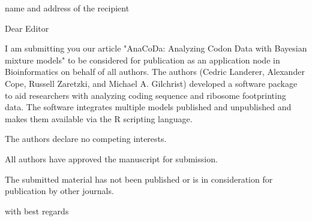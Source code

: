 \documentclass[11pt,letterpaper]{letter}
\begin{document}
 
\begin{letter}{name and address of the recipient} 
\opening{Dear Editor} 

I am submitting you our article "AnaCoDa: Analyzing Codon Data with Bayesian mixture models" to be considered for publication as an application node in Bioinformatics on behalf of all authors.
The authors (Cedric Landerer, Alexander Cope, Russell Zaretzki, and Michael A. Gilchrist) developed a software package to aid researchers with analyzing coding sequence and ribosome footprinting data. 
The software integrates multiple models published and unpublished and makes them available via the R scripting language. 

The authors declare no competing interests.

All authors have approved the manuscript for submission.

The submitted material has not been published or is in consideration for publication by other journals. 
 
\closing{with best regards} 
\end{letter} 
\end{document}
